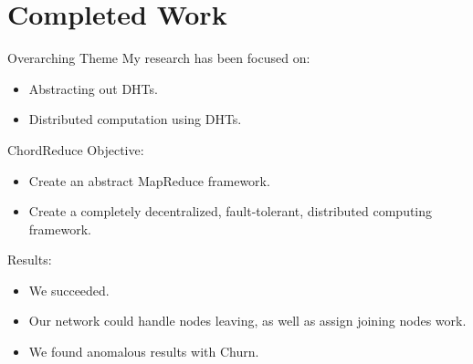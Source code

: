 \documentclass[11pt]{beamer}
\begin{document}


\section{Completed Work}

\begin{frame}{Overarching Theme}
My research has been focused on:
	\begin{itemize}
		\item Abstracting out DHTs.
		\item Distributed computation using DHTs.
	\end{itemize}
\end{frame}


\begin{frame}{ChordReduce}
Objective:
\begin{itemize}
	\item Create an abstract MapReduce framework.
	\item Create a completely decentralized, fault-tolerant, distributed computing framework. 
\end{itemize}

Results:
\begin{itemize}
	\item We succeeded.
	\item Our network could handle nodes leaving, as well as assign joining nodes work.
	\item We found anomalous results with Churn.
\end{itemize}

\end{frame}
\end{document}
